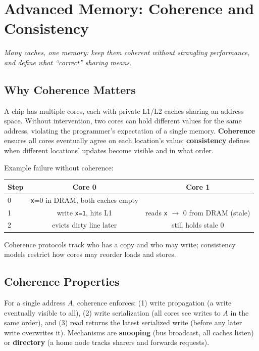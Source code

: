 \chapter{Advanced Memory: Coherence and Consistency}\label{ch:memory-advanced}
\begin{center}\small\textit{Many caches, one memory: keep them coherent without strangling performance, and define what ``correct'' sharing means.}\end{center}

\section{Why Coherence Matters}
A chip has multiple cores, each with private L1/L2 caches sharing an address space. Without intervention, two cores can hold different values for the same address, violating the programmer's expectation of a single memory. \textbf{Coherence} ensures all cores eventually agree on each location's value; \textbf{consistency} defines when different locations' updates become visible and in what order.

Example failure without coherence:
\begin{center}\begin{tabular}{lcc}
\toprule Step & Core 0 & Core 1 \\ \midrule
0 & \texttt{x}=0 in DRAM, both caches empty & \\
1 & write \texttt{x=1}, hits L1 & reads \texttt{x} $\to$ 0 from DRAM (stale) \\
2 & evicts dirty line later & still holds stale 0 \\ \bottomrule
\end{tabular}\end{center}
Coherence protocols track who has a copy and who may write; consistency models restrict how cores may reorder loads and stores.

\section{Coherence Properties}
For a single address $A$, coherence enforces: (1) write propagation (a write eventually visible to all), (2) write serialization (all cores see writes to $A$ in the same order), and (3) read returns the latest serialized write (before any later write overwrites it). Mechanisms are \textbf{snooping} (bus broadcast, all caches listen) or \textbf{directory} (a home node tracks sharers and forwards requests).

